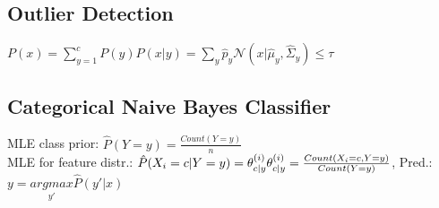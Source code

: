 \subsection*{Outlier Detection}
$P(x) = \sum_{y=1}^c P(y) P(x|y) = \sum_y \hat{p}_y \mathcal{N}(x|\hat{\mu}_y,\hat{\Sigma}_y) \leq \tau$

\subsection*{Categorical Naive Bayes Classifier}
MLE class prior: $\hat{P}(Y=y) = \frac{Count(Y=y)}{n}$\\
MLE for feature distr.:
$\hat{P}(X_i = c|Y = y) = \theta_{c|y}^{(i)}\\
\theta_{c|y}^{(i)} = \frac{Count(X_i = c, Y = y)}{Count(Y=y)}$, Pred.: $y = \underset{y'}{argmax}\hat{P}(y'|x)$


